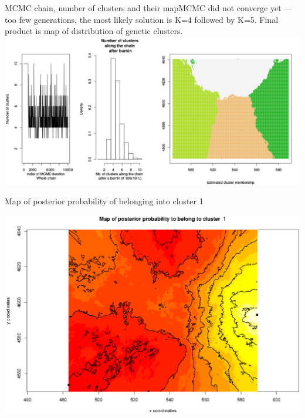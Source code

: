 \documentclass[compress, ucs, xelatex, 11pt, xcolor=svgnames,
  hyperref={
    bookmarks=true,
    unicode=true,
    colorlinks=true,
    pdftitle={Molecular data in R},
    plainpages=false,
    pdfauthor={Vojtech Zeisek},
    pdfsubject={Course about phylogeny and evolution in R},
    pdfcreator={XeLaTeX},
    pdfkeywords={R, evolution, phylogeny, molecular data},
    linkcolor=Tomato,
    anchorcolor=SaddleBrown,
    citecolor=Goldenrod,
    filecolor=DarkMagenta,
    menucolor=Sienna,
    urlcolor=DarkTurquoise,
    pdftex},
  url={hyphens, lowtilde} %
  ]{beamer}
\begin{document}
\begin{frame}{MCMC chain, number of clusters and their map}{MCMC did not converge yet --- too few generations, the most likely solution is K=4 followed by K=5. Final product is map of distribution of genetic clusters.}
  \includegraphics[width=\textwidth]{geneland1.png}
\end{frame}

\begin{frame}{Map of posterior probability of belonging into cluster 1}
  \begin{center}
    \includegraphics[width=\textwidth-1.5cm]{geneland2.png}
  \end{center}
\end{frame}
\end{document}
